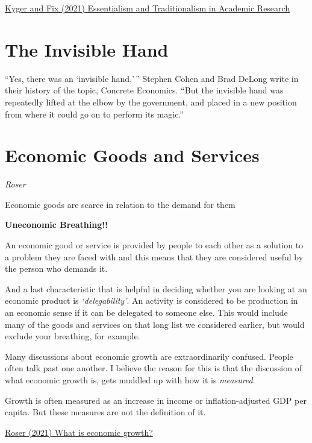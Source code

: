\documentclass[
]{book}
\begin{document}
\href{https://economicsfromthetopdown.com/2021/07/02/essentialism-and-traditionalism-in-academic-research/}{Kyger and Fix (2021) Essentialism and Traditionalism in Academic Research}

\hypertarget{the-invisible-hand}{%
\section{The Invisible Hand}\label{the-invisible-hand}}

``Yes, there was an `invisible hand,'\,'' Stephen Cohen and Brad DeLong write in their history of the topic, Concrete Economics. ``But the invisible hand was repeatedly lifted at the elbow by the government, and placed in a new position from where it could go on to perform its magic.''

\hypertarget{economic-goods-and-services}{%
\section{Economic Goods and Services}\label{economic-goods-and-services}}

\emph{Roser}

Economic goods are scarce in relation to the demand for them

\textbf{Uneconomic Breathing!!}

An economic good or service is provided by people to each other as a solution to a problem they are faced with and this means that they are considered useful by the person who demands it.

And a last characteristic that is helpful in deciding whether you are looking at an economic product is \emph{`delegability'}.
An activity is considered to be production in an economic sense if it can be delegated to someone else.
This would include many of the goods and services on that long list we considered earlier, but would exclude your breathing, for example.

Many discussions about economic growth are extraordinarily confused. People often talk past one another. I believe the reason for this is that the discussion of what economic growth is, gets muddled up with how it is \emph{measured}.

Growth is often measured as an increase in income or inflation-adjusted GDP per capita. But these measures are not the definition of it.

\href{https://ourworldindata.org/what-is-economic-growth}{Roser (2021) What is economic growth?}
\end{document}
